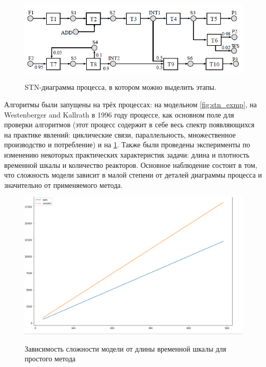 \documentclass[12pt, twoside]{article}
\theoremstyle{definition}
\begin{document}
\begin{figure}[h]
\caption{STN-диаграмма процесса, в котором можно выделить этапы.}
\centering
\includegraphics[width=1.0\textwidth]{stagedstn}
\label{fig:stn_staged}
\end{figure}

Алгоритмы были запущены на трёх процессах: на модельном \ref{fig:stn_exmp}, на Westenberger and Kallrath в 1996 году процессе, как основном поле для проверки алгоритмов (этот процесс содержит в себе весь спектр появляющихся на практике явлений: циклические связи, параллельность, множественное производство и потребление) и на \ref{fig:stn_staged}. Также были проведены эксперименты по изменению некоторых практических характеристик задачи: длина и плотность временной шкалы и количество реакторов. Основное наблюдение состоит в том, что сложность модели зависит в малой степени от деталей диаграммы процесса и значительно от применяемого метода.

\begin{figure}[h]
\caption{Зависимость сложности модели от длины временной шкалы для простого метода}
\centering
\includegraphics[width=1.0\textwidth]{экспериментальные данные/simple discrete/зависимость от времени}
\label{fig:simple-time}
\end{figure}
\end{document}
